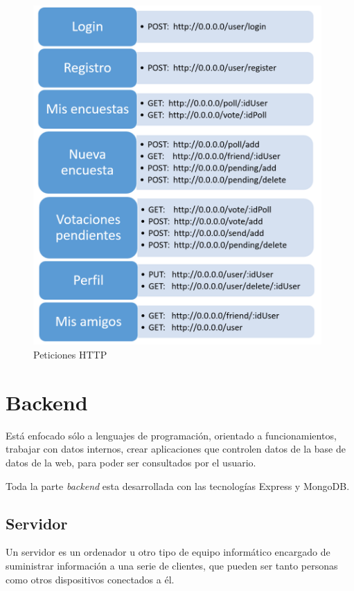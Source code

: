 \documentclass[a4paper, 12pt]{book}
\begin{document}
\begin{figure}[H]
  \centering
  \includegraphics[width=11cm, keepaspectratio]{img/http_service.png}
  \caption{Peticiones HTTP}
  \label{figura:http_service}
\end{figure}



\section{Backend}
\label{sec:backend}

Est\'a enfocado s\'olo a lenguajes de programaci\'on, orientado a funcionamientos, trabajar con datos internos, crear aplicaciones que controlen datos  de la base de datos de la web, para poder ser consultados por el usuario.

Toda la parte \emph{backend} esta desarrollada con las tecnolog\'ias Express y MongoDB. 


\subsection{Servidor} 
\label{sec:servidor}

Un servidor es un ordenador u otro tipo de equipo inform\'atico encargado de suministrar informaci\'on a una serie de clientes, que pueden ser tanto personas como otros dispositivos conectados a \'el. 
\end{document}

